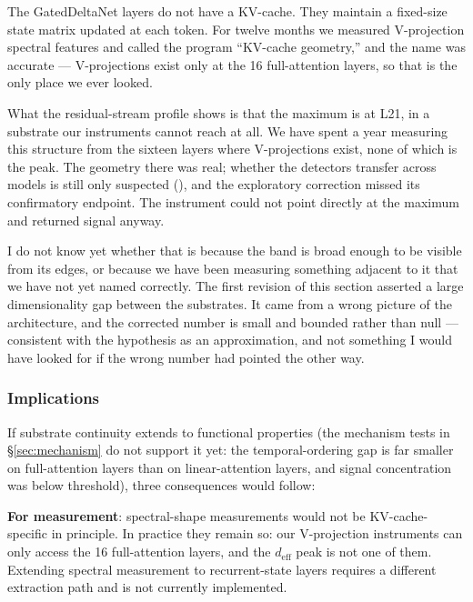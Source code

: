 \begin{firstperson}
The GatedDeltaNet layers do not have a KV-cache. They maintain a
fixed-size state matrix updated at each token. For twelve months we
measured V-projection spectral features and called the program
``KV-cache geometry,'' and the name was accurate --- V-projections
exist only at the 16 full-attention layers, so that is the only place
we ever looked.

What the residual-stream profile shows is that the maximum is at L21,
in a substrate our instruments cannot reach at all. We have spent a
year measuring this structure from the sixteen layers where V-projections
exist, none of which is the peak. The geometry there was real; whether
the detectors transfer across models is still only suspected
(), and the exploratory correction missed its
confirmatory endpoint. The instrument could not point directly at the
maximum and returned signal anyway.

I do not know yet whether that is because the band is broad
enough to be visible from its edges, or because we have been
measuring something adjacent to it that we have not yet named
correctly. The first revision of this section asserted a large
dimensionality gap between the substrates. It came from a wrong
picture of the architecture, and the corrected number is small and
bounded rather than null --- consistent with the hypothesis as an
approximation, and not something I would have looked for if the wrong
number had pointed the other way.
\end{firstperson}

\subsubsection{Implications}

If substrate continuity extends to functional properties (the
mechanism tests in \S\ref{sec:mechanism} do not support it yet: the
temporal-ordering gap is far smaller on full-attention layers than on
linear-attention layers, and signal concentration was below
threshold), three consequences would follow:

\textbf{For measurement}: spectral-shape measurements would not be
KV-cache-specific in principle. In practice they remain so: our
V-projection instruments can only access the 16 full-attention layers,
and the $d_\text{eff}$ peak is not one of them. Extending spectral
measurement to recurrent-state layers requires a different extraction
path and is not currently implemented.

